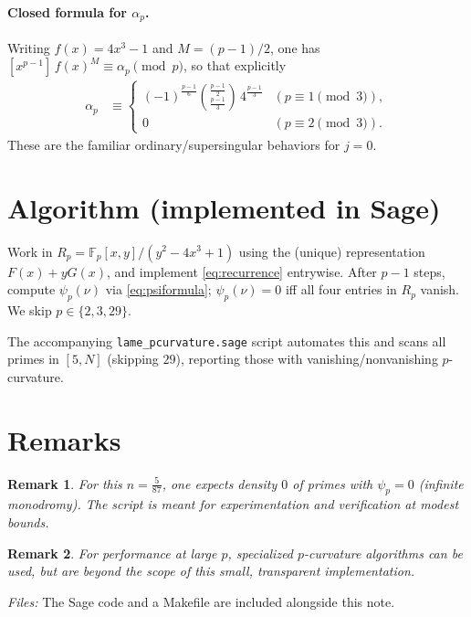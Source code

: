\documentclass[11pt]{article}
\newtheorem{remark}{Remark}
\begin{document}
\paragraph{Closed formula for \(\alpha_p\).}
Writing \(f(x)=4x^3-1\) and \(M=(p-1)/2\), one has
\([x^{p-1}]\,f(x)^{M}\equiv \alpha_p \pmod p\), so that explicitly
\begin{align*}
\alpha_p &\equiv
\begin{cases}
(-1)^{\frac{p-1}{6}}\binom{\frac{p-1}{2}}{\frac{p-1}{3}}\,4^{\frac{p-1}{3}} & (p\equiv 1\!\!\!\pmod 3),\\[4pt]
0 & (p\equiv 2\!\!\!\pmod 3).
\end{cases}
\end{align*}
These are the familiar ordinary/supersingular behaviors for \(j=0\).

\section*{Algorithm (implemented in Sage)}
Work in \(R_p=\mathbb{F}_p[x,y]/(y^2-4x^3+1)\) using the (unique) representation
\(F(x)+yG(x)\), and implement \eqref{eq:recurrence} entrywise.
After \(p-1\) steps, compute \(\psi_p(\nu)\) via \eqref{eq:psiformula};
\(\psi_p(\nu)=0\) iff all four entries in \(R_p\) vanish.
We skip \(p\in\{2,3,29\}\).

\medskip
The accompanying \texttt{lame\_pcurvature.sage} script automates this and scans all primes in
\([5,N]\) (skipping \(29\)), reporting those with vanishing/nonvanishing \(p\)-curvature.

\section*{Remarks}
\begin{remark}
For this \(n=\tfrac{5}{87}\), one expects density \(0\) of primes with \(\psi_p=0\)
(infinite monodromy). The script is meant for experimentation and verification at modest bounds.
\end{remark}

\begin{remark}
For performance at large \(p\), specialized \(p\)-curvature algorithms can be used,
but are beyond the scope of this small, transparent implementation.
\end{remark}

\bigskip
\noindent\emph{Files:} The Sage code and a Makefile are included alongside this note.
\end{document}
